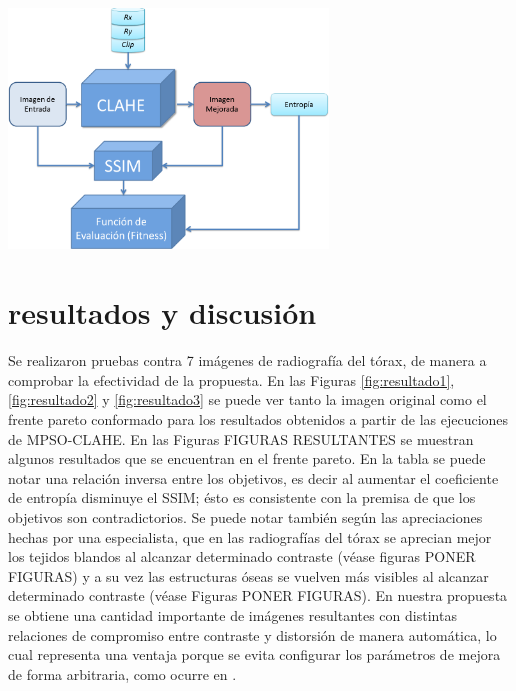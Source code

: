 \documentclass[spanish,twocolumn]{article}
\begin{document}
\begin{minipage}[b]{1.0\linewidth}
  \vspace{0.5cm}
  \centering
  \centerline{\includegraphics[width=8.5cm]{Figures/particula_clahe}}
  \vspace{0.5cm}
  \label{fig:particula_clahe}
\end{minipage}

\section{resultados y discusión}
\label{sec:resultadosdiscusion}

Se realizaron pruebas contra {\color{red} 7} imágenes de radiografía del tórax, de manera a comprobar la efectividad de la propuesta. En las Figuras \ref{fig:resultado1}, \ref{fig:resultado2} y \ref{fig:resultado3} se puede ver tanto la imagen original como el frente pareto conformado para los resultados obtenidos a partir de las ejecuciones de MPSO-CLAHE. En las Figuras {\color{red} FIGURAS RESULTANTES} se muestran algunos resultados que se encuentran en el frente pareto. En la tabla {\color{red}} se puede notar una relación inversa entre los objetivos, es decir al aumentar el coeficiente de entropía disminuye el SSIM; ésto es consistente con la premisa de que los objetivos son contradictorios. Se puede notar también según las apreciaciones hechas por una especialista, que en las radiografías del tórax se aprecian mejor los tejidos blandos al alcanzar determinado contraste (véase figuras {\color{red} PONER FIGURAS}) y a su vez las estructuras óseas se vuelven más visibles al alcanzar determinado contraste (véase Figuras {\color{red} PONER FIGURAS)}. En nuestra propuesta se obtiene una cantidad importante de imágenes resultantes con distintas relaciones de compromiso entre contraste y distorsión de manera automática, lo cual representa una ventaja porque se evita configurar los parámetros de mejora de forma arbitraria, como ocurre en \cite{1419470}.
\end{document}
